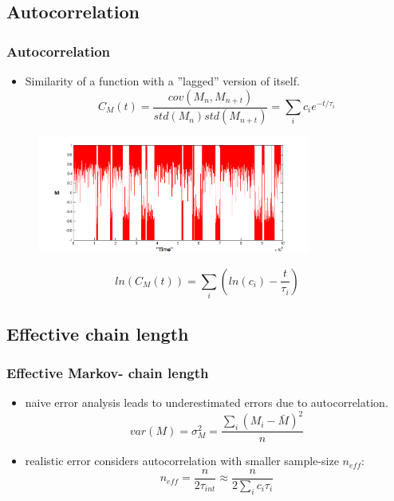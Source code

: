\documentclass{beamer}
\begin{document}
\subsection{Autocorrelation}
\begin{frame}\frametitle{Autocorrelation}
\begin{itemize}
\item Similarity of a function with a ''lagged'' version of itself.
\[C_M(t) =\frac{cov(M_n,M_{n+t})}{std(M_n)std(M_{n+t})} = \sum_i c_ie^{-t/\tau_i}\]
\end{itemize}
\begin{figure}[h]\begin{center}\includegraphics[width = 0.8\textwidth]{./img/MPlot.png}\end{center}\end{figure}
\end{frame}


\begin{frame}

\[ln\left(C_M(t)\right) = \sum_i \left(ln(c_i) - \frac{t}{\tau_i}\right)\]
\end{frame}
\subsection{Effective chain length}
\begin{frame}
\frametitle{Effective Markov- chain length}
\begin{itemize}
\item naive error analysis leads to underestimated errors due to autocorrelation. \[var(M) = \sigma_M^2 = \frac{\sum_i \left(M_i-\bar M\right)^2}{n}\]
\item realistic error considers autocorrelation with smaller sample-size $n_{eff}$:\[ n_{eff} = \frac{n}{2\tau_{int}} \approx \frac{n}{2\sum_i c_i \tau_i}\]
\end{itemize}
\end{frame}

\end{document}
